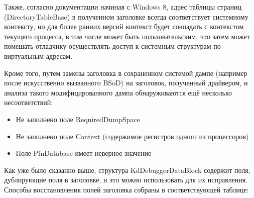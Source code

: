 \documentclass{mipt-thesis-bs}
\begin{document}
Также, согласно документации начиная с Windows 8, адрес таблицы страниц (DirectoryTableBase) в полученном заголовке всегда соответствует системному контексту, но для более ранних версий контекст будет совпадать с контекстом текущего процесса, в том числе может быть пользовательским, что затем может помешать отладчику осуществлять доступ к системным структурам по виртуальным адресам.

Кроме того, путем замены заголовка в сохраненном системой дампе (например после искусственно вызванного BSoD) на заголовок, полученный драйвером, и анализа такого модифицированного дампа обнаруживаются ещё несколько несоответствий:

\begin{itemize}
\item Не заполнено поле RequiredDumpSpace
\item Не заполнено поле Context (содержимое регистров одного из процессоров)
\item Поле PfnDatabase имеет неверное значение
\end{itemize}

Как уже было сказанно выше, структура KdDebuggerDataBlock содержит поля, дублирующие поля в заголовке, и это можно использовать для их исправления.
Способы восстановления полей заголовка собраны в соответствующей таблице:
\end{document}
